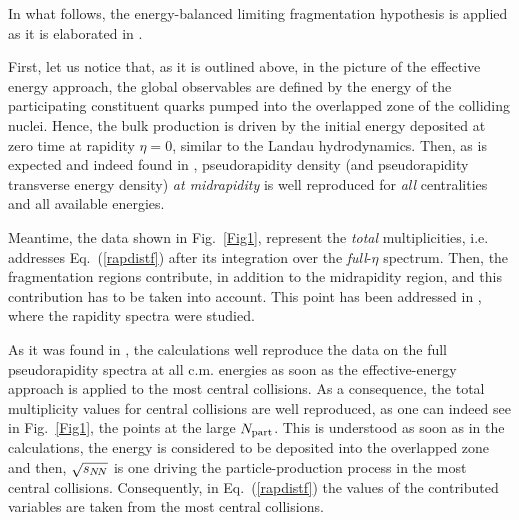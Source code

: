 \documentclass[twocolumn,showpacs,preprintnumbers,prd,superscriptaddress,nofootinbib]{revtex4}
\begin{document}
 In what follows,
 the energy-balanced limiting fragmentation hypothesis is applied as it is 
 elaborated 
in  . 

 First, let us notice that,
 as it is outlined above, in the picture of the 
effective energy 
 approach, the global observables are defined by the energy of the 
 participating constituent quarks pumped into the overlapped zone of the 
 colliding nuclei. Hence, the bulk production is driven by the initial 
 energy deposited at zero time at rapidity $\eta=0$, similar to the
 Landau hydrodynamics. Then, as
  is expected and indeed found in , 
  pseudorapidity density (and pseudorapidity transverse energy density) 
  {\it 
  at midrapidity} is well reproduced for {\it all} centralities and all 
available energies.

 
Meantime, the data shown in Fig.~\ref{Fig1}, represent the 
{\it total} multiplicities, i.e. addresses  Eq.~(\ref{rapdistf}) 
after its integration over the {\it full}-$\eta$ spectrum. 
 Then, the fragmentation regions contribute, in addition to the 
midrapidity region, and this contribution has to be taken into account.
 This point has been addressed in  , where the rapidity 
spectra were studied. 

 As it was found in , the calculations well reproduce the 
data on the full pseudorapidity spectra at all c.m. energies as soon as 
the effective-energy approach is applied to the most central collisions. 
As a consequence, the total multiplicity values for central collisions are 
well reproduced, as one can indeed see in Fig.~\ref{Fig1}, the points at 
the large $N_{\rm part}$. This is understood as soon as in the 
calculations, the energy is considered to be deposited into the overlapped 
zone and then, $\sqrt{s_{N\!N}}$ is one driving the particle-production process in 
the most 
central collisions. Consequently, in Eq.~(\ref{rapdistf}) the values of 
the contributed variables are taken from the most central collisions. 
\end{document}

